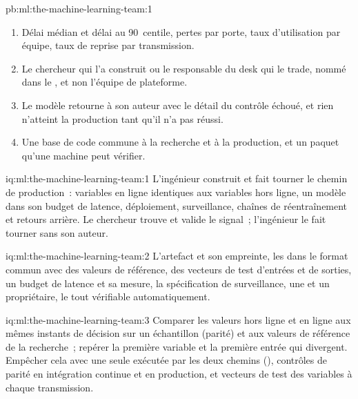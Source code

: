 \begin{solution}{pb:ml:the-machine-learning-team:1}
\begin{enumerate}[resume]
\item Délai médian et délai au 90~centile, pertes par porte, taux d'utilisation par équipe, taux de reprise par transmission.
\item Le chercheur qui l'a construit ou le responsable du desk qui le trade, nommé dans le , et non l'équipe de plateforme.
\item Le modèle retourne à son auteur avec le détail du contrôle échoué, et rien n'atteint la production tant qu'il n'a pas réussi.
\item Une base de code commune à la recherche et à la production, et un paquet qu'une machine peut vérifier.
\end{enumerate}
\end{solution}

\begin{solution}{iq:ml:the-machine-learning-team:1}
L'ingénieur construit et fait tourner le chemin de production~: variables en ligne identiques aux variables hors ligne, un modèle dans son budget de latence, déploiement,
surveillance, chaînes de réentraînement et retours arrière. Le chercheur trouve et valide le signal~; l'ingénieur le fait tourner sans
son auteur.
\end{solution}

\begin{solution}{iq:ml:the-machine-learning-team:2}
L'artefact et son empreinte, les  dans le format commun avec des valeurs de référence, des vecteurs de test d'entrées et
de sorties, un budget de latence et sa mesure, la spécification de surveillance, une  et un propriétaire, le tout vérifiable automatiquement.
\end{solution}

\begin{solution}{iq:ml:the-machine-learning-team:3}
Comparer les valeurs hors ligne et en ligne aux mêmes instants de décision sur un échantillon (parité) et aux valeurs de référence de la recherche~;
repérer la première variable et la première entrée qui divergent. Empêcher cela avec une seule  exécutée par les deux chemins (),
contrôles de parité en intégration continue et en production, et vecteurs de test des variables à chaque transmission.
\end{solution}

